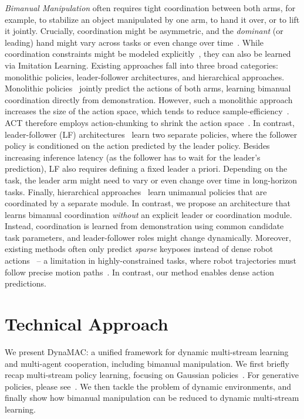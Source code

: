 \documentclass[letterpaper, 10 pt, journal, twoside]{IEEEtran}
\newcommand{\para}[1]{\parskip=5pt\noindent\textit{#1}}
\newcommand{\ourmethod}{DynaMAC\xspace}
\begin{document}
\para{Bimanual Manipulation} often requires tight coordination between both arms, for example, to stabilize an object manipulated by one arm, to hand it over, or to lift it jointly.
Crucially, coordination might be asymmetric, and the \emph{dominant} (or leading) hand might vary across tasks or even change over time~\cite{krebs2022taxonomy}.
While coordination constraints might be modeled explicitly~\cite{sina2016coordinated}, they can also be learned via Imitation Learning.
Existing approaches fall into three broad categories: monolithic policies, leader-follower architectures, and hierarchical approaches.
Monolithic policies~\cite{grotz2024peract2, lee2025interact} jointly predict the actions of both arms, learning bimanual coordination directly from demonstration.
%
However, such a monolithic approach increases the size of the action space, which tends to reduce sample-efficiency~\cite{zhao2023dualafford}.
ACT therefore employs action-chunking to shrink the action space~\cite{zhao2023learning}.
In contrast, leader-follower (LF) architectures~\cite{zhao2023dualafford, grotz2024peract2} learn two separate policies, where the follower policy is conditioned on the action predicted by the leader policy.
Besides increasing inference latency (as the follower has to wait for the leader's prediction), LF also requires defining a fixed leader a priori.
Depending on the task, the leader arm might need to vary or even change over time in long-horizon tasks.
%
Finally, hierarchical approaches~\cite{jiang2025rethinking, lu2025anybimanual} learn unimanual policies that are coordinated by a separate module.
In contrast, we propose an architecture that learns bimanual coordination \emph{without} an explicit leader or coordination module.
Instead, coordination is learned from demonstration using common candidate task parameters, and leader-follower roles might change dynamically.
%
Moreover, existing methods often only predict \emph{sparse} keyposes instead of dense robot actions~\cite{grotz2024peract2,lee2025interact, lu2025anybimanual} -- a limitation in highly-constrained tasks, where robot trajectories must follow precise motion paths~\cite{von2025unreasonable}.
%
In contrast, our method enables dense action predictions.

%
%
%


%
%
%
%
%

%
%
%
%
%
%
%
%
%


\section{Technical Approach}
We present \ourmethod{}: a unified framework for dynamic multi-stream learning and multi-agent cooperation, including bimanual manipulation.
%
We first briefly recap multi-stream policy learning, focusing on Gaussian policies~\cite{calinon2016tutorial, zeestraten2018programming, von2024art, von2025unreasonable}.
For generative policies, please see~\cite{von2026msg}.
We then tackle the problem of dynamic environments, and finally show how bimanual manipulation can be reduced to dynamic multi-stream learning.
\end{document}
